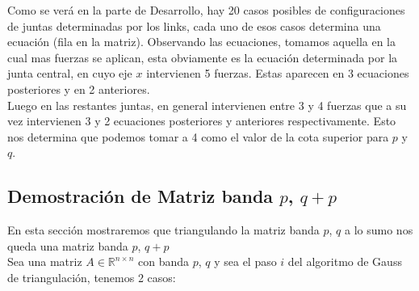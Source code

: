 Como se verá en la parte de Desarrollo, hay 20 casos posibles de configuraciones de juntas determinadas por los links, cada uno de esos casos determina una ecuación (fila en la matriz). Observando las ecuaciones, tomamos aquella en la cual mas fuerzas se aplican, esta obviamente es la ecuación determinada por la junta central, en cuyo eje $x$ intervienen 5 fuerzas. Estas aparecen en 3 ecuaciones posteriores y en 2 anteriores.\\

Luego en las restantes juntas, en general intervienen entre 3 y 4 fuerzas que a su vez intervienen 3 y 2 ecuaciones posteriores y anteriores respectivamente. Esto nos determina que podemos tomar a 4 como el valor de la cota superior para $p$ y $q$.

\subsection{Demostración de Matriz banda $p$, $q + p$}

En esta sección mostraremos que triangulando la matriz banda $p$, $q$ a lo sumo nos queda una matriz banda $p$, $q + p$\\

Sea una matriz $A \in \mathbb{R}^{n \times n}$ con banda $p$, $q$ y sea el paso $i$ del algoritmo de Gauss de triangulación, tenemos 2 casos:

